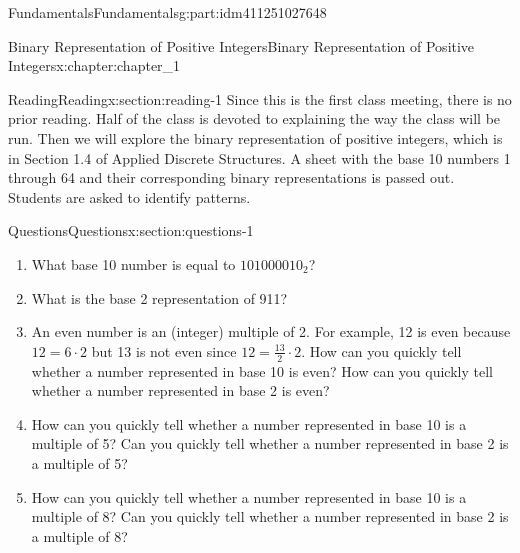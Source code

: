 \documentclass[oneside,10pt,]{book}
\numberwithin{equation}{section}
\begin{document}
\mainmatter
%
%
\typeout{************************************************}
\typeout{************************************************}
%
\begin{partptx}{Fundamentals}{}{Fundamentals}{}{}{g:part:idm411251027648}
%
\typeout{************************************************}
\typeout{************************************************}
%
\begin{chapterptx}{Binary Representation of Positive Integers}{}{Binary Representation of Positive Integers}{}{}{x:chapter:chapter_1}
%
%
%
\typeout{************************************************}
\typeout{************************************************}
%
\begin{sectionptx}{Reading}{}{Reading}{}{}{x:section:reading-1}
Since this is the first class meeting, there is no prior reading.  Half of the class is devoted to explaining the way the class will be run.  Then we will explore the binary representation of positive integers, which is in Section 1.4 of Applied Discrete Structures.  A sheet with the base 10 numbers 1 through 64 and their corresponding binary representations is passed out.  Students are asked to identify patterns.%
\end{sectionptx}
%
%
\typeout{************************************************}
\typeout{************************************************}
%
\begin{sectionptx}{Questions}{}{Questions}{}{}{x:section:questions-1}
%
\begin{enumerate}[label=\arabic*.]
\item{}What base 10 number is equal to \(101000010_2\)?%
\item{}What is the base 2 representation of 911?%
\item{}An even number is an (integer) multiple of 2.  For example, 12 is even because \(12 = 6 \cdot 2\) but 13 is not even since \(12 = \frac{13}{2} \cdot 2\).  How can you quickly tell whether a number represented in base 10  is even?  How can you quickly tell whether a number represented in base 2  is even?%
\item{}How can you quickly tell whether a number represented in base 10  is a multiple of 5?  Can you quickly tell whether a number represented in base 2  is a multiple of 5?%
\item{}How can you quickly tell whether a number represented in base 10  is a multiple of 8?  Can you quickly tell whether a number represented in base 2  is a multiple of 8?%

\end{enumerate}
\end{sectionptx}
\end{chapterptx}
\end{partptx}
\end{document}
